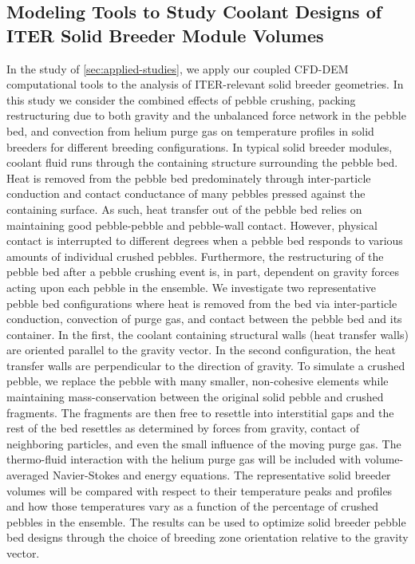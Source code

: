 \subsection*{Modeling Tools to Study Coolant Designs of ITER Solid Breeder Module Volumes}
In the study of \cref{sec:applied-studies}, we apply our coupled CFD-DEM computational tools to the analysis of ITER-relevant solid breeder geometries. In this study we consider the combined effects of pebble crushing, packing restructuring due to both gravity and the unbalanced force network in the pebble bed, and convection from helium purge gas on temperature profiles in solid breeders for different breeding configurations. In typical solid breeder modules, coolant fluid runs through the containing structure surrounding the pebble bed. Heat is removed from the pebble bed predominately through inter-particle conduction and contact conductance of many pebbles pressed against the containing surface. As such, heat transfer out of the pebble bed relies on maintaining good pebble-pebble and pebble-wall contact. However, physical contact is interrupted to different degrees when a pebble bed responds to various amounts of individual crushed pebbles. Furthermore, the restructuring of the pebble bed after a pebble crushing event is, in part, dependent on gravity forces acting upon each pebble in the ensemble. We investigate two representative pebble bed configurations where heat is removed from the bed via inter-particle conduction, convection of purge gas, and contact between the pebble bed and its container. In the first, the coolant containing structural walls (heat transfer walls) are oriented parallel to the gravity vector. In the second configuration, the heat transfer walls are perpendicular to the direction of gravity. To simulate a crushed pebble, we replace the pebble with many smaller, non-cohesive elements while maintaining mass-conservation between the original solid pebble and crushed fragments. The fragments are then free to resettle into interstitial gaps and the rest of the bed resettles as determined by forces from gravity, contact of neighboring particles, and even the small influence of the moving purge gas. The thermo-fluid interaction with the helium purge gas will be included with volume-averaged Navier-Stokes and energy equations. The representative solid breeder volumes will be compared with respect to their temperature peaks and profiles and how those temperatures vary as a function of the percentage of crushed pebbles in the ensemble. The results can be used to optimize solid breeder pebble bed designs through the choice of breeding zone orientation relative to the gravity vector.

